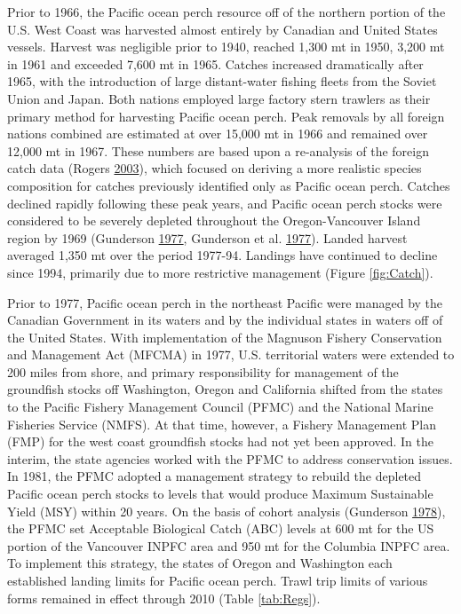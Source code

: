 \documentclass[12pt,]{article}
\begin{document}
Prior to 1966, the Pacific ocean perch resource off of the northern
portion of the U.S. West Coast was harvested almost entirely by Canadian
and United States vessels. Harvest was negligible prior to 1940, reached
1,300 mt in 1950, 3,200 mt in 1961 and exceeded 7,600 mt in 1965.
Catches increased dramatically after 1965, with the introduction of
large distant-water fishing fleets from the Soviet Union and Japan. Both
nations employed large factory stern trawlers as their primary method
for harvesting Pacific ocean perch. Peak removals by all foreign nations
combined are estimated at over 15,000 mt in 1966 and remained over
12,000 mt in 1967. These numbers are based upon a re-analysis of the
foreign catch data (Rogers
\protect\hyperlink{ref-rogers_species_2003}{2003}), which focused on
deriving a more realistic species composition for catches previously
identified only as Pacific ocean perch. Catches declined rapidly
following these peak years, and Pacific ocean perch stocks were
considered to be severely depleted throughout the Oregon-Vancouver
Island region by 1969 (Gunderson
\protect\hyperlink{ref-gunderson_population_1977}{1977}, Gunderson et
al. \protect\hyperlink{ref-gunderson_status_1977}{1977}). Landed harvest
averaged 1,350 mt over the period 1977-94. Landings have continued to
decline since 1994, primarily due to more restrictive management (Figure
\ref{fig:Catch}).

Prior to 1977, Pacific ocean perch in the northeast Pacific were managed
by the Canadian Government in its waters and by the individual states in
waters off of the United States. With implementation of the Magnuson
Fishery Conservation and Management Act (MFCMA) in 1977, U.S.
territorial waters were extended to 200 miles from shore, and primary
responsibility for management of the groundfish stocks off Washington,
Oregon and California shifted from the states to the Pacific Fishery
Management Council (PFMC) and the National Marine Fisheries Service
(NMFS). At that time, however, a Fishery Management Plan (FMP) for the
west coast groundfish stocks had not yet been approved. In the interim,
the state agencies worked with the PFMC to address conservation issues.
In 1981, the PFMC adopted a management strategy to rebuild the depleted
Pacific ocean perch stocks to levels that would produce Maximum
Sustainable Yield (MSY) within 20 years. On the basis of cohort analysis
(Gunderson \protect\hyperlink{ref-gunderson_results_1978}{1978}), the
PFMC set Acceptable Biological Catch (ABC) levels at 600 mt for the US
portion of the Vancouver INPFC area and 950 mt for the Columbia INPFC
area. To implement this strategy, the states of Oregon and Washington
each established landing limits for Pacific ocean perch. Trawl trip
limits of various forms remained in effect through 2010 (Table
\ref{tab:Regs}).
\end{document}
